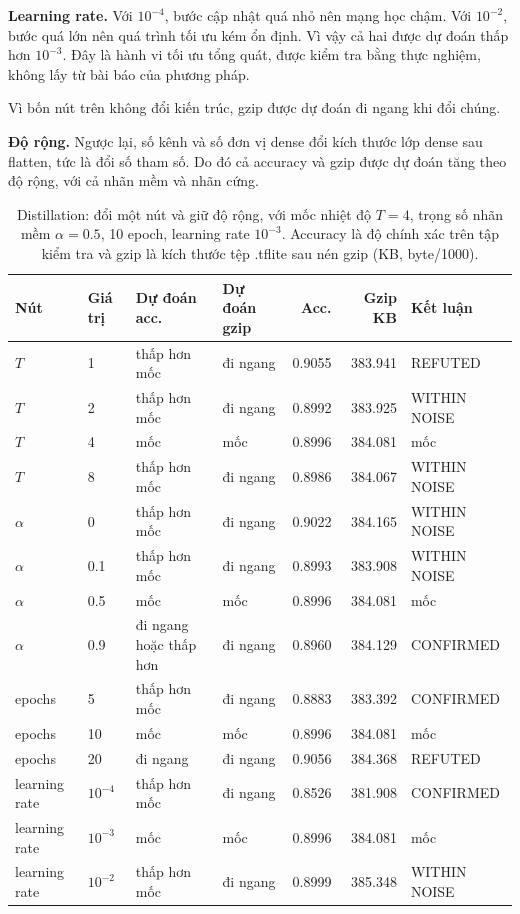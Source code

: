 \documentclass[13pt,a4paper]{article}
\begin{document}
\textbf{Learning rate.} Với \(10^{-4}\), bước cập nhật quá nhỏ nên mạng học chậm. Với \(10^{-2}\), bước quá lớn nên quá trình tối ưu kém ổn định. Vì vậy cả hai được dự đoán thấp hơn \(10^{-3}\). Đây là hành vi tối ưu tổng quát, được kiểm tra bằng thực nghiệm, không lấy từ bài báo của phương pháp.

Vì bốn nút trên không đổi kiến trúc, gzip được dự đoán đi ngang khi đổi chúng.

\textbf{Độ rộng.} Ngược lại, số kênh và số đơn vị dense đổi kích thước lớp dense sau flatten, tức là đổi số tham số. Do đó cả accuracy và gzip được dự đoán tăng theo độ rộng, với cả nhãn mềm và nhãn cứng.
\begin{table}[H]
\centering
\caption{Distillation: đổi một nút và giữ độ rộng, với mốc nhiệt độ \(T=4\), trọng số nhãn mềm \(\alpha=0.5\), 10 epoch, learning rate \(10^{-3}\). Accuracy là độ chính xác trên tập kiểm tra và gzip là kích thước tệp .tflite sau nén gzip (KB, byte/1000).}
\label{tab:sweep-distill}
\begin{tabular}{|l|l|l|l|r|r|l|}
\hline
Nút & Giá trị & Dự đoán acc. & Dự đoán gzip & Acc. & Gzip KB & Kết luận \\ \hline
\(T\) & 1 & thấp hơn mốc & đi ngang & 0.9055 & 383.941 & REFUTED \\ \hline
\(T\) & 2 & thấp hơn mốc & đi ngang & 0.8992 & 383.925 & WITHIN NOISE \\ \hline
\(T\) & 4 & mốc & mốc & 0.8996 & 384.081 & mốc \\ \hline
\(T\) & 8 & thấp hơn mốc & đi ngang & 0.8986 & 384.067 & WITHIN NOISE \\ \hline
\(\alpha\) & 0 & thấp hơn mốc & đi ngang & 0.9022 & 384.165 & WITHIN NOISE \\ \hline
\(\alpha\) & 0.1 & thấp hơn mốc & đi ngang & 0.8993 & 383.908 & WITHIN NOISE \\ \hline
\(\alpha\) & 0.5 & mốc & mốc & 0.8996 & 384.081 & mốc \\ \hline
\(\alpha\) & 0.9 & đi ngang hoặc thấp hơn & đi ngang & 0.8960 & 384.129 & CONFIRMED \\ \hline
epochs & 5 & thấp hơn mốc & đi ngang & 0.8883 & 383.392 & CONFIRMED \\ \hline
epochs & 10 & mốc & mốc & 0.8996 & 384.081 & mốc \\ \hline
epochs & 20 & đi ngang & đi ngang & 0.9056 & 384.368 & REFUTED \\ \hline
learning rate & \(10^{-4}\) & thấp hơn mốc & đi ngang & 0.8526 & 381.908 & CONFIRMED \\ \hline
learning rate & \(10^{-3}\) & mốc & mốc & 0.8996 & 384.081 & mốc \\ \hline
learning rate & \(10^{-2}\) & thấp hơn mốc & đi ngang & 0.8999 & 385.348 & WITHIN NOISE \\ \hline
\end{tabular}
\end{table}
\end{document}

